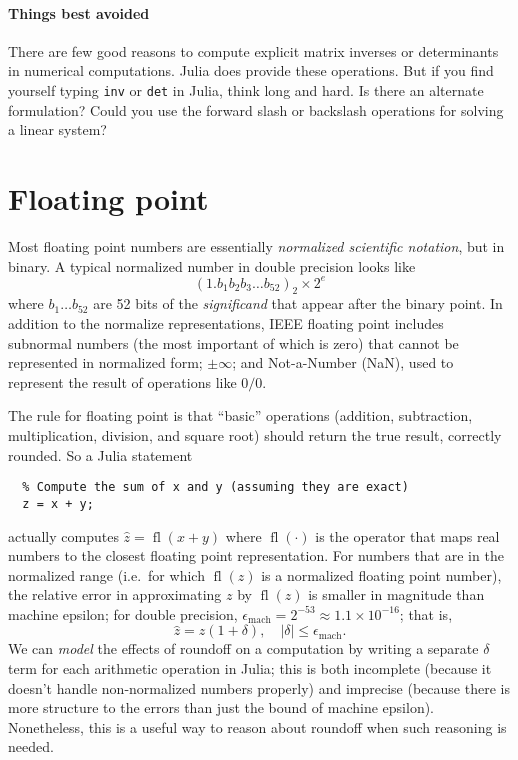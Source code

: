 \documentclass[12pt, leqno]{article}
\begin{document}
\paragraph{Things best avoided}
There are few good reasons to compute explicit matrix inverses or
determinants in numerical computations.  Julia does provide these
operations.  But if you find yourself typing {\tt inv} or {\tt det} in
Julia, think long and hard.  Is there an alternate formulation?
Could you use the forward slash or backslash operations for solving a
linear system?

\section{Floating point}
Most floating point numbers are essentially
{\em normalized scientific notation}, but in binary.
A typical normalized number in double precision looks like
\[
  (1.b_1 b_2 b_3 \ldots b_{52})_2 \times 2^{e}
\]
where $b_1 \ldots b_{52}$ are 52 bits of the {\em significand}
that appear after the binary point.  In addition to the normalize
representations, IEEE floating point includes subnormal numbers
(the most important of which is zero) that cannot be represented
in normalized form; $\pm \infty$; and Not-a-Number (NaN), used
to represent the result of operations like $0/0$.

The rule for floating point is that ``basic'' operations
(addition, subtraction, multiplication, division, and square root)
should return the true result, correctly rounded.  So a Julia 
statement
\begin{lstlisting}
  % Compute the sum of x and y (assuming they are exact)
  z = x + y;
\end{lstlisting}
actually computes $\hat{z} = \operatorname{fl}(x+y)$ where
$\operatorname{fl}(\cdot)$ is the operator that maps real numbers to
the closest floating point representation.  For numbers that are in
the normalized range (i.e.~for which $\operatorname{fl}(z)$ is a
normalized floating point number), the relative error in approximating
$z$ by $\operatorname{fl}(z)$ is smaller in magnitude than machine
epsilon; for double precision, $\epsilon_{\mathrm{mach}} = 2^{-53}
\approx 1.1 \times 10^{-16}$; that is,
\[
  \hat{z} = z(1+\delta), \quad |\delta| \leq \epsilon_{\mathrm{mach}}.
\]
We can {\em model} the effects of roundoff on a computation by writing
a separate $\delta$ term for each arithmetic operation in Julia;
this is both incomplete (because it doesn't handle non-normalized
numbers properly) and imprecise (because there is more structure to
the errors than just the bound of machine epsilon).  Nonetheless,
this is a useful way to reason about roundoff when such reasoning
is needed.
\end{document}
